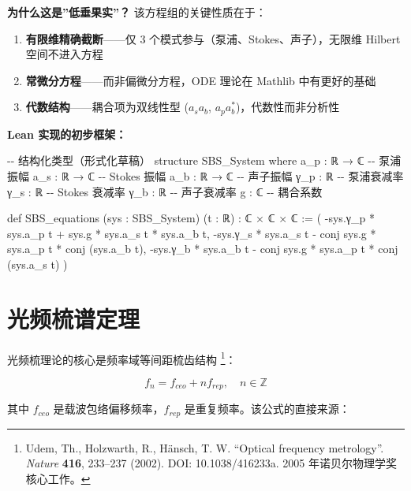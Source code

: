 \documentclass[
  11pt,
  a4paper,
]{ctexrep}
\newenvironment{Shaded}{\begin{snugshade}}{\end{snugshade}}
\newcommand{\NormalTok}[1]{\textcolor[rgb]{0.00,0.23,0.31}{#1}}
\providecommand{\tightlist}{%
  \setlength{\itemsep}{0pt}\setlength{\parskip}{0pt}}
\begin{document}
\textbf{为什么这是''低垂果实''？} 该方程组的关键性质在于：

\begin{enumerate}
\def\labelenumi{\arabic{enumi}.}
\tightlist
\item
  \textbf{有限维精确截断}------仅 3
  个模式参与（泵浦、Stokes、声子），无限维 Hilbert 空间不进入方程
\item
  \textbf{常微分方程}------而非偏微分方程，ODE 理论在 Mathlib
  中有更好的基础
\item
  \textbf{代数结构}------耦合项为双线性型 (\(a_s a_b\),
  \(a_p a_b^*\))，代数性而非分析性
\end{enumerate}

\textbf{Lean 实现的初步框架：}

\begin{Shaded}
\begin{Highlighting}[]
\NormalTok{{-}{-} 结构化类型（形式化草稿）}
\NormalTok{structure SBS\_System where}
\NormalTok{  a\_p : ℝ → ℂ    {-}{-} 泵浦振幅}
\NormalTok{  a\_s : ℝ → ℂ    {-}{-} Stokes 振幅}
\NormalTok{  a\_b : ℝ → ℂ    {-}{-} 声子振幅}
\NormalTok{  γ\_p : ℝ         {-}{-} 泵浦衰减率}
\NormalTok{  γ\_s : ℝ         {-}{-} Stokes 衰减率}
\NormalTok{  γ\_b : ℝ         {-}{-} 声子衰减率}
\NormalTok{  g   : ℂ         {-}{-} 耦合系数}

\NormalTok{def SBS\_equations (sys : SBS\_System) (t : ℝ) : ℂ × ℂ × ℂ :=}
\NormalTok{  ( {-}sys.γ\_p * sys.a\_p t + sys.g * sys.a\_s t * sys.a\_b t,}
\NormalTok{    {-}sys.γ\_s * sys.a\_s t {-} conj sys.g * sys.a\_p t * conj (sys.a\_b t),}
\NormalTok{    {-}sys.γ\_b * sys.a\_b t {-} conj sys.g * sys.a\_p t * conj (sys.a\_s t) )}
\end{Highlighting}
\end{Shaded}

\section{光频梳谱定理}\label{ux5149ux9891ux68b3ux8c31ux5b9aux7406}

光频梳理论的核心是频率域等间距梳齿结构 \footnote{Udem, Th., Holzwarth,
  R., Hänsch, T. W. ``Optical frequency metrology''. \emph{Nature}
  \textbf{416}, 233--237 (2002). DOI: 10.1038/416233a. 2005
  年诺贝尔物理学奖核心工作。}：

\[
f_n = f_{ceo} + n f_{rep}, \quad n \in \mathbb{Z}
\]

其中 \(f_{ceo}\) 是载波包络偏移频率，\(f_{rep}\)
是重复频率。该公式的直接来源：
\end{document}
